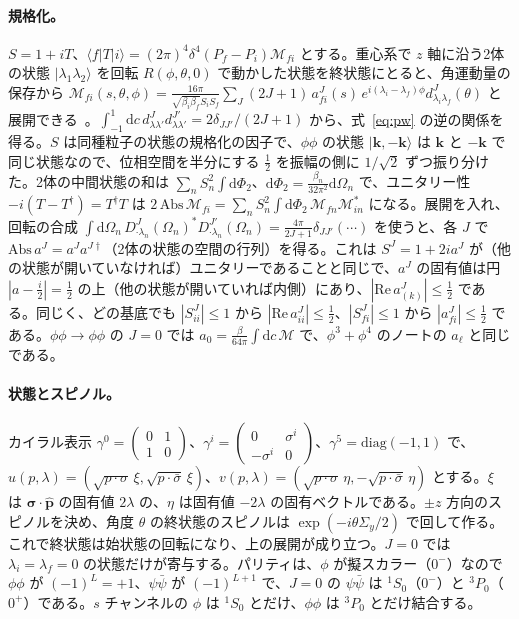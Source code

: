 \documentclass[a4paper,10pt]{ltjsarticle}
\newcommand{\dd}{\mathrm{d}}
\begin{document}
\paragraph{規格化。}$S=1+iT$、$\langle f|T|i\rangle=(2\pi)^4\delta^4(P_f-P_i)\mathcal M_{fi}$ とする。重心系で $z$ 軸に沿う2体の状態 $|\lambda_1\lambda_2\rangle$ を回転 $R(\phi,\theta,0)$ で動かした状態を終状態にとると、角運動量の保存から $\mathcal M_{fi}(s,\theta,\phi)=\frac{16\pi}{\sqrt{\beta_i\beta_f}S_iS_f}\sum_J(2J+1)\,a^J_{fi}(s)\,e^{i(\lambda_i-\lambda_f)\phi}d^J_{\lambda_i\lambda_f}(\theta)$ と展開できる~\cite{jw}。$\int_{-1}^1\dd c\,d^J_{\lambda\lambda'}d^{J'}_{\lambda\lambda'}=2\delta_{JJ'}/(2J+1)$ から、式~\eqref{eq:pw} の逆の関係を得る。$S$ は同種粒子の状態の規格化の因子で、$\phi\phi$ の状態 $|\boldsymbol k,-\boldsymbol k\rangle$ は $\boldsymbol k$ と $-\boldsymbol k$ で同じ状態なので、位相空間を半分にする $\frac12$ を振幅の側に $1/\sqrt2$ ずつ振り分けた。2体の中間状態の和は $\sum_nS_n^2\int\dd\Phi_2$、$\dd\Phi_2=\frac{\beta_n}{32\pi^2}\dd\Omega_n$ で、ユニタリー性 $-i(T-T^\dagger)=T^\dagger T$ は $2\,\mathrm{Abs}\,\mathcal M_{fi}=\sum_nS_n^2\int\dd\Phi_2\,\mathcal M_{fn}\mathcal M^*_{in}$ になる。展開を入れ、回転の合成 $\int\dd\Omega_n\,D^{J}_{\cdot\lambda_n}(\Omega_n)^*D^{J'}_{\cdot\lambda_n}(\Omega_n)=\frac{4\pi}{2J+1}\delta_{JJ'}(\cdots)$ を使うと、各 $J$ で $\mathrm{Abs}\,a^J=a^Ja^{J\dagger}$（2体の状態の空間の行列）を得る。これは $S^J=1+2ia^J$ が（他の状態が開いていなければ）ユニタリーであることと同じで、$a^J$ の固有値は円 $|a-\frac i2|=\frac12$ の上（他の状態が開いていれば内側）にあり、$|\mathrm{Re}\,a^J_{(k)}|\le\frac12$ である。同じく、どの基底でも $|S^J_{ii}|\le1$ から $|\mathrm{Re}\,a^J_{ii}|\le\frac12$、$|S^J_{fi}|\le1$ から $|a^J_{fi}|\le\frac12$ である。$\phi\phi\to\phi\phi$ の $J=0$ では $a_0=\frac{\beta}{64\pi}\int\dd c\,\mathcal M$ で、$\phi^3+\phi^4$ のノートの $a_\ell$ と同じである。

\paragraph{状態とスピノル。}カイラル表示 $\gamma^0=\begin{pmatrix}0&1\\1&0\end{pmatrix}$、$\gamma^i=\begin{pmatrix}0&\sigma^i\\-\sigma^i&0\end{pmatrix}$、$\gamma^5=\mathrm{diag}(-1,1)$ で、$u(p,\lambda)=(\sqrt{p\cdot\sigma}\,\xi,\sqrt{p\cdot\bar\sigma}\,\xi)$、$v(p,\lambda)=(\sqrt{p\cdot\sigma}\,\eta,-\sqrt{p\cdot\bar\sigma}\,\eta)$ とする。$\xi$ は $\boldsymbol\sigma\cdot\hat{\boldsymbol p}$ の固有値 $2\lambda$ の、$\eta$ は固有値 $-2\lambda$ の固有ベクトルである。$\pm z$ 方向のスピノルを決め、角度 $\theta$ の終状態のスピノルは $\exp(-i\theta\Sigma_y/2)$ で回して作る。これで終状態は始状態の回転になり、上の展開が成り立つ。$J=0$ では $\lambda_i=\lambda_f=0$ の状態だけが寄与する。パリティは、$\phi$ が擬スカラー（$0^-$）なので $\phi\phi$ が $(-1)^L=+1$、$\psi\bar\psi$ が $(-1)^{L+1}$ で、$J=0$ の $\psi\bar\psi$ は ${}^1S_0$（$0^-$）と ${}^3P_0$（$0^+$）である。$s$ チャンネルの $\phi$ は ${}^1S_0$ とだけ、$\phi\phi$ は ${}^3P_0$ とだけ結合する。
\end{document}
